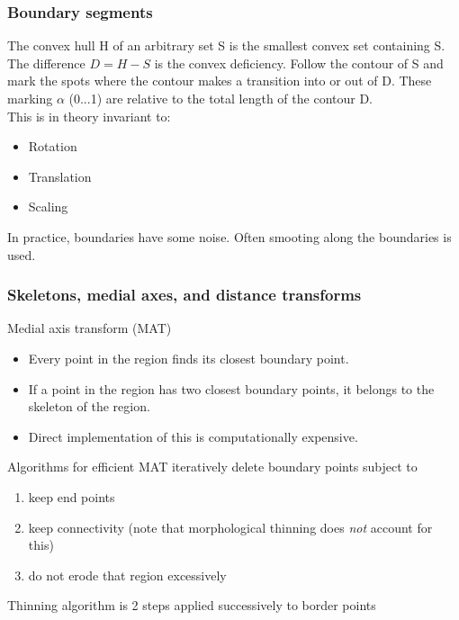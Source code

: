 \subsubsection{Boundary segments} %
The convex hull H of an arbitrary set S is the smallest convex set containing S. The difference $D=H-S$ is the convex deficiency. Follow the contour of S and mark the spots where the contour makes a transition into or out of D. These marking $\alpha$ (0...1) are relative to the total length of the contour D.\\
This is in theory invariant to:\\
\begin{itemize}
\item Rotation
\item Translation
\item Scaling
\end{itemize}
In practice, boundaries have some noise. Often smooting along the boundaries is used.\\
\subsubsection{Skeletons, medial axes, and distance transforms}
Medial axis transform (MAT)
\begin{itemize}
\item Every point in the region finds its closest boundary point.
\item If a point in the region has two closest boundary points, it belongs to the skeleton of the region.
\item Direct implementation of this is computationally expensive.
\end{itemize}
Algorithms for efficient MAT iteratively delete boundary points subject to
\begin{enumerate}
\item keep end points
\item keep connectivity (\small note that morphological thinning does \emph{not} account for this)
\item do not erode that region excessively
\end{enumerate}
Thinning algorithm is 2 steps applied successively to border points\\
\\
